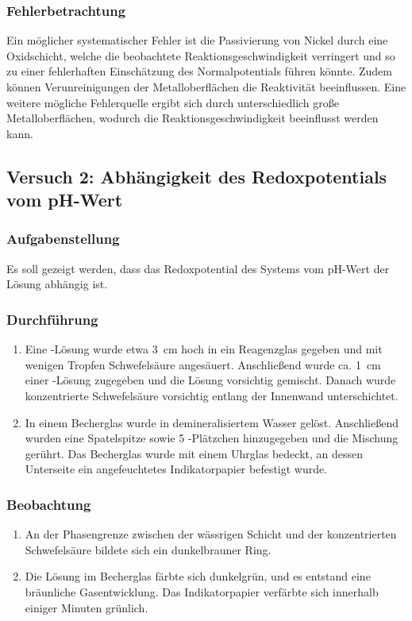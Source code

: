 \subsubsection{Fehlerbetrachtung}
Ein möglicher systematischer Fehler ist die Passivierung von Nickel durch eine Oxidschicht, welche die beobachtete Reaktionsgeschwindigkeit verringert und so zu einer fehlerhaften Einschätzung des Normalpotentials führen könnte. Zudem können Verunreinigungen der Metalloberflächen die Reaktivität beeinflussen. Eine weitere mögliche Fehlerquelle ergibt sich durch unterschiedlich große Metalloberflächen, wodurch die Reaktionsgeschwindigkeit beeinflusst werden kann.

\subsection{Versuch 2: Abhängigkeit des Redoxpotentials vom pH-Wert}


\subsubsection{Aufgabenstellung}
Es soll gezeigt werden, dass das Redoxpotential des Systems  vom pH-Wert der Lösung abhängig ist.

\subsubsection{Durchführung}
\begin{enumerate}[label=\textbf{\alph*)}]
    \item Eine -Lösung wurde etwa \SI{3}{cm} hoch in ein Reagenzglas gegeben und mit wenigen Tropfen Schwefelsäure angesäuert. Anschließend wurde ca. \SI{1}{cm} einer -Lösung zugegeben und die Lösung vorsichtig gemischt. Danach wurde konzentrierte Schwefelsäure vorsichtig entlang der Innenwand unterschichtet.
    \item In einem Becherglas wurde  in demineralisiertem Wasser gelöst. Anschließend wurden eine Spatelspitze  sowie 5 -Plätzchen hinzugegeben und die Mischung gerührt. Das Becherglas wurde mit einem Uhrglas bedeckt, an dessen Unterseite ein angefeuchtetes Indikatorpapier befestigt wurde.
\end{enumerate}

\subsubsection{Beobachtung}
\begin{enumerate}[label=\textbf{\alph*)}]
    \item An der Phasengrenze zwischen der wässrigen Schicht und der konzentrierten Schwefelsäure bildete sich ein dunkelbrauner Ring.
    \item Die Lösung im Becherglas färbte sich dunkelgrün, und es entstand eine bräunliche Gasentwicklung. Das Indikatorpapier verfärbte sich innerhalb einiger Minuten grünlich.
\end{enumerate}

